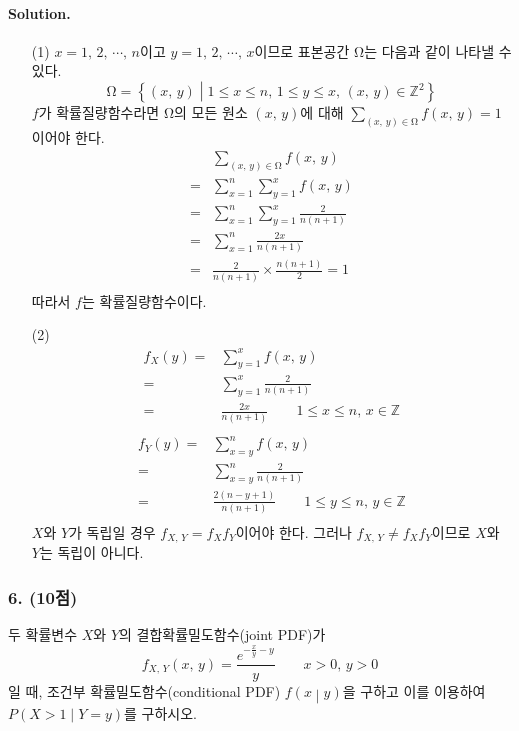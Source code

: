 \paragraph{Solution.} 
\begin{itemize}
	\item [(1)] {
		$x=1,\,2,\,\cdots,\,n$이고 $y=1,\,2,\,\cdots,\,x$이므로 표본공간 $\mathrm{\Omega}$는 다음과 같이 나타낼 수 있다.
		\[\mathrm{\Omega} = \left\{\left(x,\, y\right) \middle| 1 \leq x \leq n ,\, 1 \leq y \leq x,\, \left(x,\, y\right) \in \mathbb{Z}^2 \right\}\]
		$f$가 확률질량함수라면 $\mathrm{\Omega}$의 모든 원소 $\left(x,\, y\right)$에 대해 $\sum_{\left(x,\, y\right) \in \mathrm{\Omega}} f\left(x,\, y\right) = 1$이어야 한다.
		\begin{align*}
			& \sum_{\left(x,\, y\right) \in \mathrm{\Omega}} f\left(x,\, y\right) \\
			=& \sum_{x=1}^{n} \sum_{y=1}^{x} f\left(x,\, y\right) \\
			=& \sum_{x=1}^{n} \sum_{y=1}^{x} \frac{2}{n\left(n + 1\right)} \\
			=& \sum_{x=1}^{n} \frac{2x}{n\left(n + 1\right)} \\
			=& \frac{2}{n\left(n + 1\right)} \times \frac{n\left(n + 1\right)}{2} = 1 \\
		\end{align*}
		따라서 $f$는 확률질량함수이다.
	}
    \item [(2)] {
		\begin{align*}
			f_X\left(y\right) =& \sum_{y=1}^{x} f\left(x,\, y\right) \\
			=& \sum_{y=1}^{x} \frac{2}{n\left(n + 1\right)} \\
			=& \frac{2x}{n\left(n + 1\right)} \qquad 1 \leq x \leq n,\, x \in \mathbb{Z}\\
		\end{align*}
		\begin{align*}
			f_Y\left(y\right) =& \sum_{x=y}^{n} f\left(x,\, y\right) \\
			=& \sum_{x=y}^{n} \frac{2}{n\left(n + 1\right)} \\
			=& \frac{2\left(n - y + 1\right)}{n\left(n + 1\right)} \qquad 1 \leq y \leq n,\, y \in \mathbb{Z}\\
		\end{align*}
		$X$와 $Y$가 독립일 경우 $f_{X,\,Y} = f_X f_Y$이어야 한다. 그러나 $f_{X,\,Y} \neq f_X f_Y$이므로 $X$와 $Y$는 독립이 아니다.
	}
\end{itemize}

\subsubsection{6. (10점)} 두 확률변수 $X$와 $Y$의 결합확률밀도함수(joint PDF)가
\[f_{X,\,Y}\left(x,\,y\right) = \frac{e^{-\frac{x}{y} - y}}{y} \qquad x > 0,\,y > 0\]
일 때, 조건부 확률밀도함수(conditional PDF) $f\left(x\middle|y\right)$을 구하고 이를 이용하여 $P\left(X>1\middle|Y=y\right)$를 구하시오.

